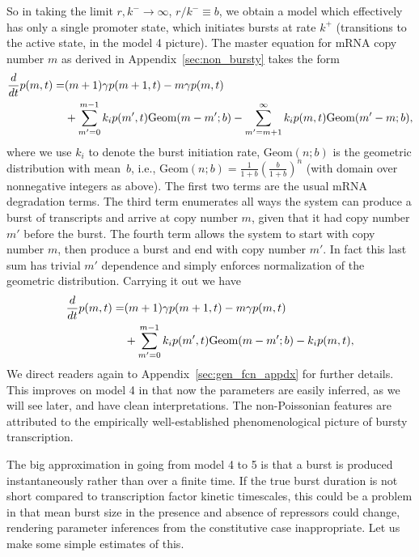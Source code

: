 So in taking the limit $r,k^-\rightarrow\infty$, $r/k^-\equiv b$, we obtain a
model which effectively has only a single promoter state, which initiates bursts
at rate $k^+$ (transitions to the active state, in the model 4 picture). The
master equation for mRNA copy number $m$ as derived in
Appendix~\ref{sec:non_bursty} takes the form
\begin{equation}
\begin{split}
{d \over dt}p(m,t) = & (m+1)\gamma p(m+1,t) - m\gamma p(m,t) \\
        &+ \sum_{m'=0}^{m-1} k_i p(m',t) \text{Geom}(m-m';b)
         - \sum_{m'=m+1}^\infty k_i p(m,t) \text{Geom}(m'-m;b),
\end{split}
\end{equation}
where we use $k_i$ to denote the burst initiation rate, $\text{Geom}(n;b)$ is
the geometric distribution with mean~$b$, i.e., $\text{Geom}(n;b) =
\frac{1}{1+b}\left(\frac{b}{1+b}\right)^n$ (with domain over nonnegative
integers as above). The first two terms are the usual mRNA degradation terms.
The third term enumerates all ways the system can produce a burst of transcripts
and arrive at copy number $m$, given that it had copy number $m'$ before the
burst. The fourth term allows the system to start with copy number $m$, then
produce a burst and end with copy number $m'$. In fact this last sum has trivial
$m'$ dependence and simply enforces normalization of the geometric distribution.
Carrying it out we have
\begin{equation}
\begin{split}
{d \over dt} p(m,t) = & (m+1)\gamma p(m+1,t) - m\gamma p(m,t) \\
        &+ \sum_{m'=0}^{m-1} k_i p(m',t) \text{Geom}(m-m';b)
            - k_i p(m,t),
\end{split}
\end{equation}
We direct readers again to Appendix~\ref{sec:gen_fcn_appdx} for further details.
This improves on model 4 in that now the parameters are easily inferred, as we
will see later, and have clean interpretations. The non-Poissonian features are
attributed to the empirically well-established phenomenological picture of
bursty transcription.

The big approximation in going from model 4 to 5 is that a burst is produced
instantaneously rather than over a finite time. If the true burst duration is
not short compared to transcription factor kinetic timescales, this could be a
problem in that mean burst size in the presence and absence of repressors could
change, rendering parameter inferences from the constitutive case inappropriate.
Let us make some simple estimates of this.

